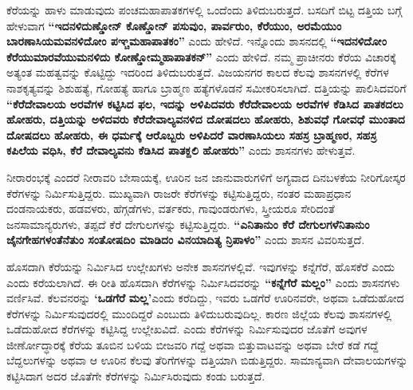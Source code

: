 ಕೆರೆಯನ್ನು ಹಾಳು ಮಾಡುವುದು ಪಂಚಮಹಾಪಾತಕಗಳಲ್ಲಿ ಒಂದೆಂದು ತಿಳಿದುಬರುತ್ತದೆ. ಬಸದಿಗೆ ಬಿಟ್ಟ ದತ್ತಿಯ ಬಗ್ಗೆ ಹೇಳುವಾಗ \textbf{“ಇದನಳಿದುಣ್ಡೋನ್​ ಕೊಣ್ಡೋನ್​ ಪಸುವುಂ, ಪಾರ್ವರುಂ, ಕೆರೆಯುಂ, ಅರಮೆಯುಂ ಬಾರಣಾಸಿಯಮವನಳಿದೋಂ ಪಞ್ಚಮಹಾಪಾತಕಂ”} ಎಂದು ಹೇಳಿದೆ. ಇನ್ನೊಂದು ಶಾಸನದಲ್ಲಿ \textbf{“ಇದನಳಿದೋಂ ಕೆರೆಯುಮಾರವೆಯುಮನಳಿದು ಕೋಣ್ಡೋಮ್ಮಹಾಪಾತಕನ್​”} ಎಂದು ಹೇಳಿದೆ. ನಮ್ಮ ಪ್ರಾಚೀನರು ಕೆರೆಯ ವಿಚಾರಕ್ಕೆ ಅತ್ಯಂತ ಮಹತ್ವವನ್ನು ಕೊಟ್ಟಿದ್ದು ಇದರಿಂದ ತಿಳಿದುಬರುತ್ತದೆ. ವಿಜಯನಗರ ಕಾಲದ ಕೆಲವು ಶಾಸನಗಳಲ್ಲಿ ಕೆರೆಗಳ ನಾಶಕೃತ್ಯವನ್ನು ಶಿಶುಹತ್ಯೆ, ಗೋಹತ್ಯೆ ಹಾಗೂ ಬ್ರಾಹ್ಮಣ ಹತ್ಯೆಗಳೊಡನೆ ಸಮೀಕರಿಸಲಾಗಿದೆ. ದತ್ತಿಯನ್ನು ಪಾಲಿಸಿದವರಿಗೆ \textbf{“ಕೆರೆದೇವಾಲಯ ಅರವೆಗಳ ಕಟ್ಟಿಸಿದ ಫಲ, ಇದನ್ನು ಅಳಿಪಿದವರು ಕೆರೆದೇವಾಲಯ ಅರವೆಗಳ ಕೆಡಿಸಿದ ಪಾತಕದಲು ಹೋಹರು, ದತ್ತಿಯನ್ನು ಅಳಿದವರು ಕೆರೆದೇವಾಲ್ಯವನಳಿದ ದೋಷದಲು ಹೋಹರು, ಶಿಶುವಧೆ ಗೋವಧೆ ಮುಂತಾದ ದೋಷದಲು ಹೋಹರು, ಈ ಧರ್ಮಕ್ಕೆ ಆರೊಬ್ಬರು ಅಳಿಪಿದರೆ ವಾರಣಾಸಿಯಲು ಸಹಸ್ರ ಬ್ರಾಹ್ಮಣರ, ಸಹಸ್ರ ಕಪಿಲೆಯ ವಧಿಸಿ, ಕೆರೆ ದೇವಾಲ್ಯವನು ಕೆಡಿಸಿದ ಪಾತಕ್ದಲಿ ಹೋಹರು”} ಎಂದು ಶಾಸನಗಳು ಹೇಳುತ್ತವೆ.

ನೀರಾರಂಭಕ್ಕೆ ಎಂದರೆ ನೀರಾವರಿ ಬೇಸಾಯಕ್ಕೆ, ಊರಿನ ಜನ ಜಾನುವಾರುಗಳಿಗೆ ಅಗ್ಯವಾದ ದಿನಬಳಕೆಯ ನೀರಿಗೋಸ್ಕರ ಕೆರೆಗಳನ್ನು ನಿರ್ಮಿಸುತ್ತಿದ್ದರು. ಮುಖ್ಯವಾಗಿ ರಾಜರೇ ಕೆರೆಗಳನ್ನು ಕಟ್ಟಿಸುತ್ತಿದ್ದರು, ನಂತರ ಮಹಾಪ್ರಧಾನ ದಂಡನಾಯಕರು, ಹಡವಳರು, ಹೆಗ್ಗಡೆಗಳು, ವರ್ತಕರು, ಗಾವುಂಡರುಗಳು, ಸ್ತ್ರೀಯರೂ ಸೇರಿದಂತೆ ಜನಸಾಮಾನ್ಯರುಗಳು, ತಪ್ಪದೆ ಕೆರೆ ದೇಗುಲಗಳನ್ನು ಕಟ್ಟಿಸುತ್ತಿದ್ದರು. \textbf{“ಎನಿತಾನುಂ ಕೆರೆ ದೇಗುಲಗಳೆನಿತಾನುಂ ಜೈನಗೇಹಗಳಂತೆನೆತುಂ ಸಂತೋಷದಿಂ ಮಾಡಿದಂ ವಿನಯಾದಿತ್ಯ ನ್ರಿಪಾಳಂ”} ಎಂದು ಶಾಸನ ವಿವರಿಸುತ್ತದೆ.

ಹೊಸದಾಗಿ ಕೆರೆಯನ್ನು ನಿರ್ಮಿಸಿದ ಉಲ್ಲೇಖಗಳು ಅನೇಕ ಶಾಸನಗಳಲ್ಲಿವೆ. ಇವುಗಳನ್ನು ಕನ್ನೆಗೆರೆ, ಹೊಸಕೆರೆ ಎಂದು ಎಂದು ಕರೆಯಲಾಗಿದೆ. ಈ ರೀತಿ ಹೊಸದಾಗಿ ಕೆರೆಗಳನ್ನು ನಿರ್ಮಿಸಿದವರನ್ನು \textbf{“ಕನ್ನೆಗೆರೆ ಮಲ್ಲಂ”} ಎಂದು ಶಾಸನಗಳು ವರ್ಣಿಸಿವೆ. ಕೆಲವನರನ್ನು \textbf{‘ಒಡಗೆರೆ} \textbf{ಮಲ್ಲ’}ಎಂದು ಕರೆದಿದ್ದು, ಇವರು ಒಡಗೆರೆ ಊರಿನವರೇ, ಅಥವಾ ಒಡೆದುಹೋದ ಕೆರೆಗಳನ್ನು ನಿರ್ಮಿಸುವುದರಲ್ಲಿ ಮುಂದಿದ್ದರೆ ಎಂಬುದು ತಿಳಿದುಬರುವುದಿಲ್ಲ. ಕಾರಣ ಜಿಲ್ಲೆಯ ಕೆಲವು ಶಾಸನಗಳಲ್ಲಿ ಒಡೆದುಹೋದ ಕೆರೆಗಳನ್ನು ಕಟ್ಟಿಸಿದ್ದ ಉಲ್ಲೇಖವಿದೆ. ಎಂದು ಕೆರೆಗಳನ್ನು ನಿರ್ಮಿಸುವುದರ ಜೊತೆಗೆ ಅವುಗಳ ಜೀರ್ಣೋದ್ಧಾರಕ್ಕೆ ಕೆರೆಯ ತೂಬಿನ ಬಳಿಯ ಬೀಜವರಿ ಗದ್ದೆ ಅಥವಾ ಬಿತ್ತುವಾಟವನ್ನು ಅಥವಾ ಬೇರೆ ಕಡೆ ಗದ್ದೆ ಬೆದ್ದಲುಗಳನ್ನು ಅಥವಾ ಆ ಊರಿನ ಕೆಲವು ತೆರಿಗೆಗಳನ್ನು ದತ್ತಿಯಾಗಿ ಬಿಡುತ್ತಿದ್ದರು. ಸಾಮಾನ್ಯವಾಗಿ ದೇವಾಲಯಗಳನ್ನು ಕಟ್ಟಿಸಿದಾಗ ಅದರ ಜೊತೆಗೇ ಕೆರೆಗಳನ್ನು ನಿರ್ಮಿಸಿರುವುದು ಕಂಡು ಬರುತ್ತದೆ.

